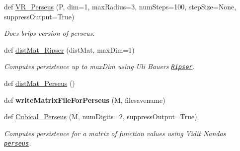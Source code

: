 \begin{DoxyCompactItemize}
\item 
def \hyperlink{namespaceteaspoon_1_1_t_d_a_1_1_persistence_ae3954f45636c5f88b8e7cb7b422eea3d}{V\+R\+\_\+\+Perseus} (P, dim=1, max\+Radius=3, num\+Steps=100, step\+Size=None, suppress\+Output=True)
\begin{DoxyCompactList}\small\item\em Does brips version of perseus. \end{DoxyCompactList}\item 
def \hyperlink{namespaceteaspoon_1_1_t_d_a_1_1_persistence_a5d253547a9b956b8d5169808f31b42d2}{dist\+Mat\+\_\+\+Ripser} (dist\+Mat, max\+Dim=1)
\begin{DoxyCompactList}\small\item\em Computes persistence up to max\+Dim using Uli Bauer\textquotesingle{}s \href{https://github.com/Ripser/ripser}{\tt Ripser}. \end{DoxyCompactList}\item 
def \hyperlink{namespaceteaspoon_1_1_t_d_a_1_1_persistence_a0660fcd00ca57001f21bfaaefb1da9c3}{dist\+Mat\+\_\+\+Perseus} ()
\item 
def {\bfseries write\+Matrix\+File\+For\+Perseus} (M, filesavename)\hypertarget{namespaceteaspoon_1_1_t_d_a_1_1_persistence_a7ee47776929d1ade75b059415918a328}{}\label{namespaceteaspoon_1_1_t_d_a_1_1_persistence_a7ee47776929d1ade75b059415918a328}

\item 
def \hyperlink{namespaceteaspoon_1_1_t_d_a_1_1_persistence_aa583aa9a694aeaa3983e77319ac68e84}{Cubical\+\_\+\+Perseus} (M, num\+Digits=2, suppress\+Output=True)
\begin{DoxyCompactList}\small\item\em Computes persistence for a matrix of function values using Vidit Nanda\textquotesingle{}s \href{http://people.maths.ox.ac.uk/nanda/perseus/index.html}{\tt perseus}. \end{DoxyCompactList}\end{DoxyCompactItemize}
